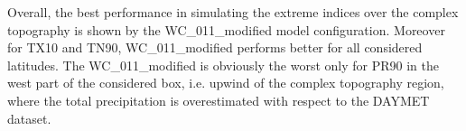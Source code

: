 \documentclass[a0b,landscape]{a0poster}
\newcommand{\hspc}{-0.5cm}
\begin{document}
\begin{multicols*}{4}
\begin{minipage}[t]{\linewidth}
\begin{center}
\end{center}
\end{minipage}

\vspace{0.25cm}
\noindent
\begin{minipage}[t]{\linewidth}
    Overall, the best performance in simulating the extreme indices over the complex
            topography is shown by the WC\_011\_modified model configuration. Moreover for TX10 and TN90, WC\_011\_modified performs better
            for all considered latitudes. The WC\_011\_modified is obviously the worst only for PR90 in the west part of the considered box,
            i.e. upwind of the complex topography region, where the total precipitation is overestimated with respect to the DAYMET dataset.
\end{minipage}




\end{multicols*}
\end{document}
